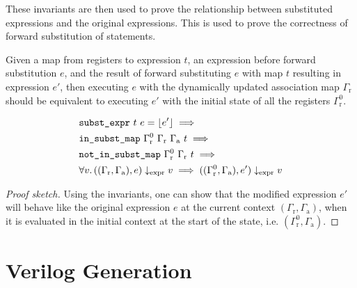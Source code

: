 These invariants are then used to prove the relationship between substituted
expressions and the original expressions.  This is used to prove the correctness
of forward substitution of statements.

\begin{lemma}%
  \label{lem:hg:forward-substitution-of-expressions}

  Given a map from registers to expression $t$, an expression before forward
  substitution $e$, and the result of forward substituting $e$ with map $t$
  resulting in expression $e'$, then executing $e$ with the dynamically updated
  association map $\Gamma_{\mathrm r}$ should be equivalent to executing $e'$
  with the initial state of all the registers $\Gamma^{0}_{\mathrm r}$.

  {\normalfont
    \begin{equation*}
      \begin{aligned}
        &\texttt{subst\_expr}\ t\ e = \lfloor e' \rfloor \implies \\
        &\texttt{in\_subst\_map}\ \Gamma^{0}_{\mathrm r}\ \Gamma_{\mathrm r}\ \Gamma_{\mathrm a}\ t \implies\\
        &\texttt{not\_in\_subst\_map}\ \Gamma^{0}_{\mathrm r}\ \Gamma_{\mathrm r}\ t \implies\\
        &\forall v\ldotp ((\Gamma_{\mathrm r}, \Gamma_{\mathrm a}), e) \downarrow_{\text{expr}} v
          \implies ((\Gamma^{0}_{\mathrm r}, \Gamma_{\mathrm a}), e') \downarrow_{\text{expr}} v
      \end{aligned}
    \end{equation*}}

  \begin{proof}[Proof sketch]
    Using the invariants, one can show that the modified expression $e'$ will
    behave like the original expression $e$ at the current context
    $(\Gamma_{\mathrm r}, \Gamma_{\mathrm a})$, when it is evaluated in the
    initial context at the start of the state, i.e.
    $(\Gamma^{0}_{\mathrm r}, \Gamma_{\mathrm a})$.
  \end{proof}
\end{lemma}


\section{Verilog Generation}%
\label{sec:hg:verilog-generation}

